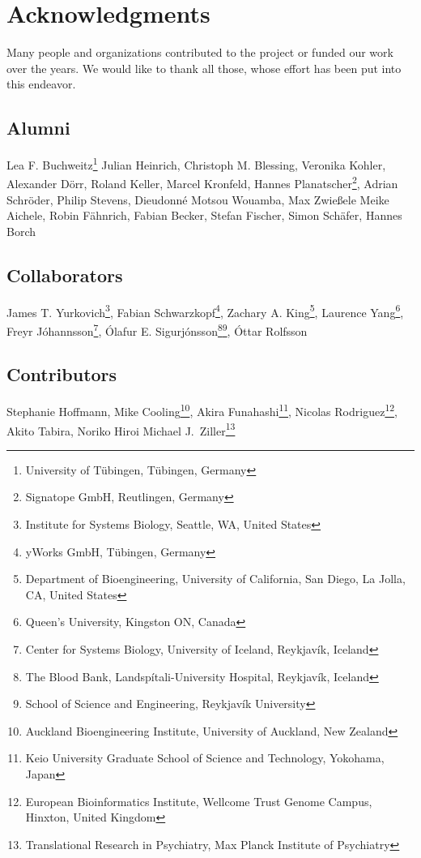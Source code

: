 \chapter{Acknowledgments}

Many people and organizations contributed to the project or funded our work over the years.
We would like to thank all those, whose effort has been put into this endeavor.

\section{Alumni}

Lea F. Buchweitz\footnote{University of T\"ubingen, T\"ubingen, Germany\label{fn:zbit}}
Julian Heinrich,
Christoph M. Blessing,
Veronika Kohler,
Alexander D\"orr,
Roland Keller,
Marcel Kronfeld, 
Hannes Planatscher\footnote{Signatope GmbH, Reutlingen, Germany},
Adrian Schr\"oder,
Philip Stevens,
Dieu\-donn\'e Motsou Wouamba,
Max Zwie\ss{}ele
Meike Aichele,
Robin Fähnrich,
Fabian Becker,
Stefan Fischer,
Simon Sch\"afer,
Hannes Borch

\section{Collaborators}

James T. Yurkovich\footnote{Institute for Systems Biology, Seattle, WA, United States},
Fabian Schwarzkopf\footnote{yWorks GmbH, T\"ubingen, Germany},
Zachary A. King\footnote{Department of Bioengineering, University of California, San Diego, La Jolla, CA, United States\label{fn:ucsd}},
Laurence Yang\footnote{Queen’s University, Kingston ON, Canada},
Freyr J\'ohannsson\footnote{Center for Systems Biology, University of Iceland, Reykjav\'ik, Iceland\label{fn:csbiceland}},
\'Olafur E. Sigurj\'onsson\footnote{The Blood Bank, Landsp\'itali-University Hospital, Reykjav\'ik, Iceland}\footnote{School of Science and Engineering, Reykjav\'ik University},
\'Ottar Rolfsson

\section{Contributors}

Stephanie Hoffmann,
Mike Cooling\footnote{Auckland Bioengineering Institute, University of Auckland, New Zealand\label{fn:auckland}},
Akira Funahashi\footnote{Keio University Graduate School of Science and Technology, Yokohama, Japan\label{fn:keio}},
Nicolas Rodriguez\footnote{European Bioinformatics Institute, Wellcome Trust Genome Campus, Hinxton, United Kingdom\label{fn:ebi}},
Akito Tabira, Noriko Hiroi
Michael J.~Ziller\footnote{Translational Research in Psychiatry, Max Planck Institute of Psychiatry}

